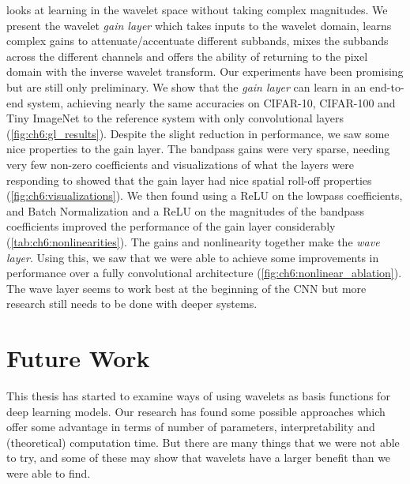 \textbf{} looks at learning in the wavelet space without
taking complex magnitudes. We present the wavelet \emph{gain layer} which takes
inputs to the wavelet domain, learns complex gains to attenuate/accentuate
different subbands, mixes the subbands across the different channels and offers
the ability of returning to the pixel domain with the inverse wavelet transform.
Our experiments have been promising but are still only preliminary. We 
show that the \emph{gain layer} can learn in an end-to-end system, achieving nearly
the same accuracies on CIFAR-10, CIFAR-100 and Tiny ImageNet to the reference system with
only convolutional layers (\autoref{fig:ch6:gl_results}).
Despite the slight reduction in performance, we saw some
nice properties to the gain layer. The bandpass gains were very sparse, 
needing very few non-zero coefficients and visualizations of what the layers
were responding to showed that the gain layer had nice
spatial roll-off properties (\autoref{fig:ch6:visualizations}).
We then found using a ReLU on the lowpass coefficients, and
Batch Normalization and a ReLU on the magnitudes of the bandpass coefficients
improved the performance of the gain layer considerably (\autoref{tab:ch6:nonlinearities}). 
The gains and nonlinearity together make the \emph{wave layer}. Using this, we
saw that we were able to achieve some improvements in performance over a fully
convolutional architecture (\autoref{fig:ch6:nonlinear_ablation}). The wave
layer seems to work best at the beginning of the CNN but more research still
needs to be done with deeper systems. 

\section{Future Work}
This thesis has started to examine ways of using wavelets as basis functions for
deep learning models. Our research has found some possible approaches 
which offer some advantage in terms of number of parameters, interpretability
and (theoretical) computation time. But there are many things that we were not
able to try, and some of these may show that wavelets have a larger benefit than
we were able to find.


